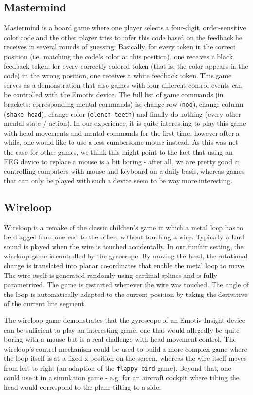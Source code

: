 \documentclass{utue} %
\begin{document}
\subsection{Mastermind}
Mastermind is a board game where one player selects a four-digit, order-sensitive color code and the other player tries to infer this code based on the feedback he receives in several rounds of guessing: Basically, for every token in the correct position (i.e. matching the code's color at this position), one receives a black feedback token; for every correctly colored token (that is, the color appears in the code) in the wrong position, one receives a white feedback token. This game serves as a demonstration that also games with four different control events can be controlled with the Emotiv device. The full list of game commands (in brackets: corresponding mental commands) is: change row (\texttt{nod}), change column (\texttt{shake head}), change color (\texttt{clench teeth}) and finally do nothing (every other mental state / action). In our experience, it is quite interesting to play this game with head movements and mental commands for the first time, however after a while, one would like to use a less cumbersome mouse instead. As this was not the case for other games, we think this might point to the fact that using an EEG device to replace a mouse is a bit boring - after all, we are pretty good in controlling computers with mouse and keyboard on a daily basis, whereas games that can only be played with such a device seem to be way more interesting.


\subsection{Wireloop}
Wireloop is a remake of the classic children's game in which a metal loop has to be dragged from one end to the other, without touching a wire. Typically a loud sound is played when the wire is touched accidentally. In our funfair setting, the wireloop game is controlled by the gyroscope: By moving the head, the rotational change is translated into planar co-ordinates that enable the metal loop to move. The wire itself is generated randomly using cardinal splines and is fully parametrized. The game is restarted whenever the wire was touched. The angle of the loop is automatically adapted to the current position by taking the derivative of the current line segment.

The wireloop game demonstrates that the gyroscope of an Emotiv Insight device can be sufficient to play an interesting game, one that would allegedly be quite boring with a mouse but is a real challenge with head movement control. The wireloop's control mechanism could be used to build a more complex game where the loop itself is at a fixed x-position on the screen, whereas the wire itself moves from left to right (an adaption of the \texttt{flappy bird} game). Beyond that, one could use it in a simulation game - e.g. for an aircraft cockpit where tilting the head would correspond to the plane tilting to a side.
\end{document}
